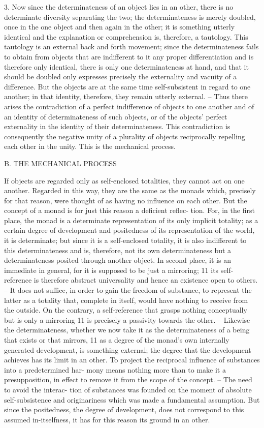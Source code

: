 3. Now since the determinateness of an object lies in an other, there is
no determinate diversity separating the two; the determinateness is merely
doubled, once in the one object and then again in the other; it is something
utterly identical and the explanation or comprehension is, therefore, a
tautology. This tautology is an external back and forth movement; since
the determinateness fails to obtain from objects that are indifferent to it
any proper differentiation and is therefore only identical, there is only
one determinateness at hand, and that it should be doubled only expresses
precisely the externality and vacuity of a difference. But the objects are
at the same time self-subsistent in regard to one another; in that identity,
therefore, they remain utterly external. – Thus there arises the contradiction
of a perfect indifference of objects to one another and of an identity of
determinateness of such objects, or of the objects' perfect externality in the
identity of their determinateness. This contradiction is consequently the
negative unity of a plurality of objects reciprocally repelling each other in
the unity. This is the mechanical process.

B. THE MECHANICAL PROCESS

If objects are regarded only as self-enclosed totalities, they cannot act on
one another. Regarded in this way, they are the same as the monads which,
precisely for that reason, were thought of as having no influence on each
other. But the concept of a monad is for just this reason a deficient reflec-
tion. For, in the first place, the monad is a determinate representation of its
only implicit totality; as a certain degree of development and positedness of its
representation of the world, it is determinate; but since it is a self-enclosed
totality, it is also indifferent to this determinateness and is, therefore, not its
own determinateness but a determinateness posited through another object.
In second place, it is an immediate in general, for it is supposed to be just a
mirroring; 11 its self-reference is therefore abstract universality and hence an
existence open to others. – It does not suffice, in order to gain the freedom of
substance, to represent the latter as a totality that, complete in itself, would
have nothing to receive from the outside. On the contrary, a self-reference
that grasps nothing conceptually but is only a mirroring 11 is precisely a
passivity towards the other. – Likewise the determinateness, whether we now
take it as the determinateness of a being that exists or that mirrors, 11 as a
degree of the monad's own internally generated development, is something
external; the degree that the development achieves has its limit in an other.
To project the reciprocal influence of substances into a predetermined har-
mony means nothing more than to make it a presupposition, in effect to
remove it from the scope of the concept. – The need to avoid the interac-
tion of substances was founded on the moment of absolute self-subsistence
and originariness which was made a fundamental assumption. But since
the positedness, the degree of development, does not correspond to this
assumed in-itselfness, it has for this reason its ground in an other.

